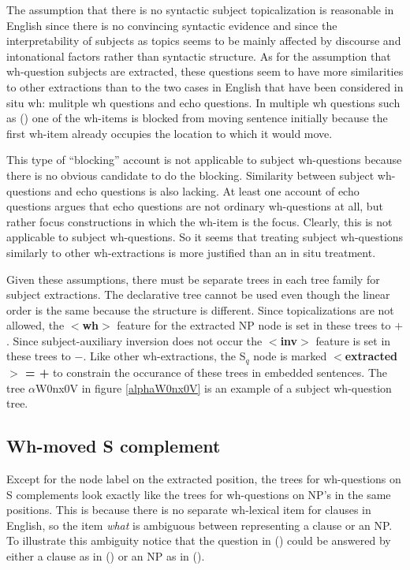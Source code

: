 The assumption that there is no syntactic subject topicalization is
reasonable in English since there is no convincing syntactic evidence
and since the interpretability of subjects as topics seems to be
mainly affected by discourse and intonational factors rather than
syntactic structure. As for the
assumption that wh-question subjects are extracted, these questions
seem to have more similarities to other extractions than to the two
cases in English that have been considered in situ wh:  mulitple wh
questions and echo questions. In multiple wh
questions such as () one of the wh-items is blocked from moving
sentence initially because the first wh-item already occupies the
location to which it would move.


This type of ``blocking'' account is not applicable to
subject wh-questions because there is no obvious candidate to do the
blocking.  Similarity between subject wh-questions and echo questions
is also lacking.  At least one account of echo questions
\cite{hockey94} argues that echo questions are not ordinary
wh-questions at all, but rather focus constructions in which the
wh-item is the focus. Clearly, this is not applicable to subject
wh-questions. So it seems that treating subject wh-questions similarly
to other wh-extractions is more justified than an in situ treatment. 

Given these assumptions, there must be separate trees in each tree
family for subject extractions. The declarative tree cannot be used
even though the linear order is the same because the structure is
different. Since topicalizations are not allowed, the {\bf $<$wh$>$}
feature for the extracted NP node is set in these trees to $+$. Since
subject-auxiliary inversion does not occur the {\bf $<$inv$>$} feature
is set in these trees to $-$.  Like other wh-extractions, the S$_{q}$ node is
marked {\bf $<$extracted$>$ = +} to constrain the occurance of these
trees in embedded sentences. The tree $\alpha$W0nx0V in figure
\ref{alphaW0nx0V} is an example of a subject wh-question tree.

\begin{figure}[htbp]
\end{figure}

\subsection{Wh-moved S complement}
Except for the node label on the extracted position, the trees for
wh-questions on S complements look exactly like the trees for
wh-questions on NP's in the same positions. This is because there is
no separate wh-lexical item for clauses in English, so the item {\it
what} is ambiguous between representing a clause or an NP.  To
illustrate this ambiguity notice that the question in () could
be answered by either a clause as in () or an NP as in ().

